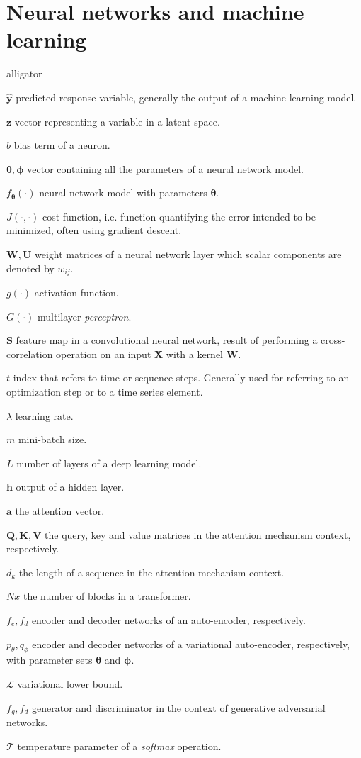 \section*{Neural networks and machine learning}

\begin{labeling}{alligator}
	\item [$\mathbf{\hat{y}}$] predicted response variable, generally the output of a machine learning model.
	\item [$\mathbf{z}$] vector representing a variable in a latent space.
	\item [$b$] bias term of a neuron.
	\item [$\mathbf{\theta}, \mathbf{\phi}$] vector containing all the parameters of a neural network model.
	\item [$f_\mathbf{\theta}(\cdot)$] neural network model with parameters $\mathbf{\theta}$.
	\item [$J(\cdot, \cdot)$] cost function, i.e. function quantifying the error intended to be minimized, often using gradient descent.
	\item [$\mathbf{W}, \mathbf{U}$] weight matrices of a neural network layer which scalar components are denoted by $w_{ij}$.
	\item[$g(\cdot)$] activation function.
	\item[$G(\cdot)$] multilayer \textit{perceptron}.
	\item[$\mathbf{S}$] feature map in a convolutional neural network, result of performing a cross-correlation operation on an input $\mathbf{X}$ with a kernel $\mathbf{W}$.
	\item[$t$] index that refers to time or sequence steps. Generally used for referring to  an optimization step or to a time series element.
	\item[$\lambda$] learning rate.
	\item[$m$] mini-batch size.
	\item[$L$] number of layers of a deep learning model.
	\item[$\mathbf{h}$] output of a hidden layer.
	\item[$\mathbf{a}$] the attention vector.
	\item[$\mathbf{Q}, \mathbf{K}, \mathbf{V}$] the query, key and value matrices in the attention mechanism context, respectively.
	\item[$d_k$]{the length of a sequence in the attention mechanism context.}
	\item[$Nx$]{the number of blocks in a transformer.}
	\item[$f_e, f_d$]{encoder and decoder networks of an auto-encoder, respectively.}
	\item[$p_\theta, q_\phi$]{encoder and decoder networks of a variational auto-encoder, respectively, with parameter sets $\mathbf{\theta}$ and $\mathbf{\phi}$.}
	\item[$\mathcal{L}$]{variational lower bound.}
	\item[$f_g, f_d$]{generator and discriminator in the context of generative adversarial networks.}
	\item[$\mathcal{T}$] temperature parameter of a \textit{softmax} operation.
\end{labeling}

